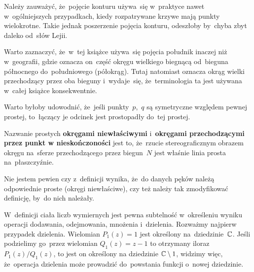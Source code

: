 \documentclass[a4paper,11pt]{article}
\begin{document}
Należy zauważyć, że~pojęcie konturu używa~się w~praktyce nawet
w~ogólniejszych przypadkach, kiedy rozpatrywane krzywe mają punkty
wielokrotne. Takie jednak poszerzenie pojęcia konturu, odeszłoby
by~chyba zbyt daleko od~słów Lejii.

\vspace{\spaceFour}



\start {} Warto zaznaczyć, że~w~tej książce używa~się pojęcia
południk inaczej niż w~geografii, gdzie oznacza on~część okręgu
wielkiego biegnącą od~bieguna północnego do~południowego (półokrąg).
Tutaj natomiast oznacza okrąg wielki przechodzący przez oba bieguny
i~wydaje~się, że~terminologia ta jest używana w~całej książce
konsekwentnie.

\vspace{\spaceFour}



\start {} Warto byłoby udowodnić, że~jeśli punkty~$p$,~$q$ są
symetryczne względem pewnej prostej, to~łączący je odcinek jest
prostopadły do~tej prostej.

\vspace{\spaceFour}



\start {} Nazwanie prostych \textbf{okręgami niewłaściwymi}
i~\textbf{okręgami przechodzącymi przez punkt w nieskończoności} jest
to, że~rzucie stereograficznym obrazem okręgu na~sferze przechodzącego
przez biegun~$N$ jest właśnie linia prosta na~płaszczyźnie.

\vspace{\spaceFour}



\start {} Nie jestem pewien czy z~definicji wynika, że~do danych
pęków należą odpowiednie proste (okręgi niewłaściwe), czy też należy
tak zmodyfikować definicję, by~do nich należały.

\vspace{\spaceFour}



\start {} W~definicji ciała liczb wymiernych jest pewna
subtelność w~określeniu wyniku operacji dodawania, odejmowania,
mnożenia i~dzielenia. Rozważmy najpierw przypadek dzielenia. Wielomian
$P_{ 1 }( z ) = 1$ jest określony na~dziedzinie~$\mathbb{C}$. Jeśli
podzielimy go~przez wielomian $Q_{ 1 }( z ) = z - 1$ to otrzymany
iloraz $P_{ 1 }( z ) / Q_{ 1 }( z )$, to jest on określony na
dziedzinie $\mathbb{C} \setminus 1$, widzimy więc, że~operacja dzielenia może
prowadzić do~powstania funkcji o~nowej dziedzinie.
\end{document}
